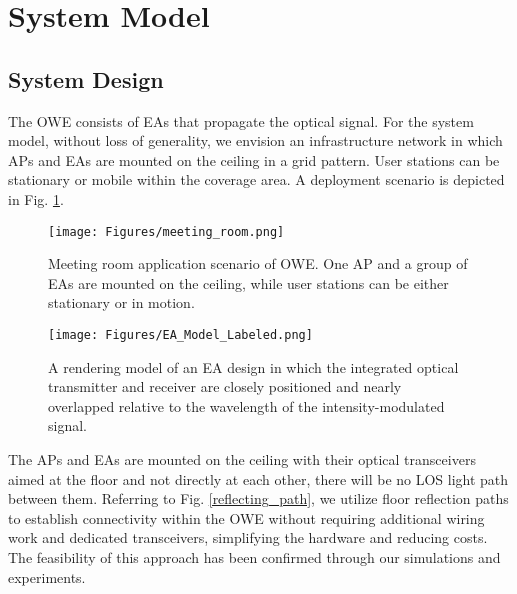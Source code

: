 \section{System Model}
\subsection{System Design}
The OWE consists of EAs that propagate the optical signal.
For the system model, without loss of generality, we envision an infrastructure network in which APs and EAs are mounted on the ceiling in a grid pattern. User stations can be stationary or mobile within the coverage area. A deployment scenario is depicted in Fig. \ref{meeting_room}.

\begin{figure}
\centering
\texttt{[image: Figures/meeting\_room.png]}
\caption{Meeting room application scenario of OWE. One AP and a group of EAs are mounted on the ceiling, while user stations can be either stationary or in motion.}
\label{meeting_room}
\vspace{-0.2cm}
\end{figure}
\par

\begin{figure}
\centering
\texttt{[image: Figures/EA\_Model\_Labeled.png]}
\caption{A rendering model of an EA design in which the integrated optical transmitter and receiver are closely positioned and nearly overlapped relative to the wavelength of the intensity-modulated signal.}
\label{EA_model}
\vspace{-0.5cm}
\end{figure}
\par
The APs and EAs are mounted on the ceiling with their optical transceivers aimed at the floor and not directly at each other, there will be no LOS light path between them. Referring to Fig. \ref{reflecting_path}, we utilize floor reflection paths to establish connectivity within the OWE without requiring additional wiring work and dedicated transceivers, simplifying the hardware and reducing costs. The feasibility of this approach has been confirmed through our simulations and experiments.

